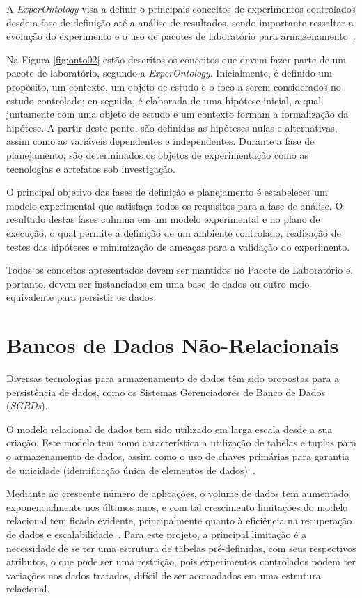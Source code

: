 A \textit{ExperOntology} visa a definir o principais conceitos de experimentos controlados desde a fase de definição até a análise de resultados, sendo importante ressaltar a evolução do experimento e o uso de pacotes de laboratório para armazenamento~\cite{Garcia08}. 

Na Figura \ref{fig:onto02} estão descritos os conceitos que devem fazer parte de um pacote de laboratório, segundo a \textit{ExperOntology}. Inicialmente, é definido um propósito, um contexto, um objeto de estudo e o foco a serem considerados no estudo controlado; en seguida, é elaborada de uma hipótese inicial, a qual juntamente com uma objeto de estudo e um contexto formam a formalização da hipótese. A partir deste ponto, são definidas as hipóteses nulas e alternativas, assim como as variáveis dependentes e independentes. Durante a fase de planejamento, são determinados os objetos de experimentação como as tecnologias e artefatos sob investigação.

O principal objetivo das fases de definição e planejamento é estabelecer um modelo experimental que satisfaça todos os requisitos para a fase de análise. O resultado destas fases culmina em um modelo experimental e no plano de execução, o qual permite a definição de um ambiente controlado, realização de testes das hipóteses e minimização de ameaças para a validação do experimento.

Todos os conceitos apresentados devem ser mantidos no Pacote de Laboratório e, portanto, devem ser instanciados em uma base de dados ou outro meio equivalente para persistir os dados.

\section{Bancos de Dados Não-Relacionais}

Diversas tecnologias para armazenamento de dados têm sido propostas para a persistência de dados, como os Sistemas Gerenciadores de Banco de Dados (\textit{SGBDs}).

O modelo relacional de dados tem sido utilizado em larga escala desde a sua criação. Este modelo tem como característica a utilização de tabelas e tuplas para o armazenamento de dados, assim como o uso de chaves primárias para garantia de unicidade (identificação única de elementos de dados)~\cite{brito2010bancos}.

Mediante ao crescente número de aplicações, o volume de dados tem aumentado exponencialmente nos últimos anos, e com tal crescimento limitações do modelo relacional tem ficado evidente, principalmente quanto à eficiência na recuperação de dados e escalabilidade~\cite{toth2011abordagem}. Para este projeto, a principal limitação é a necessidade de se ter uma estrutura de tabelas pré-definidas, com seus respectivos atributos, o que pode ser uma restrição, pois experimentos controlados podem ter variações nos dados tratados, difícil de ser acomodados em uma estrutura relacional.


